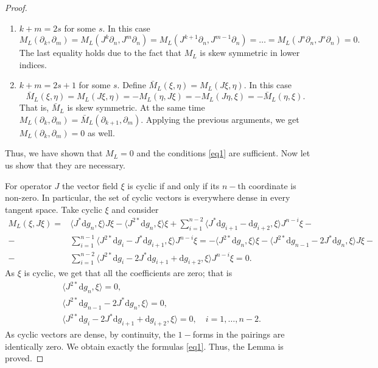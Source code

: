 \documentclass[12pt]{article}
\theoremstyle{remark}
\newcommand{\ddd}{\mathrm{d}}
\begin{document}
\begin{proof}
\begin{enumerate}
    \item $k + m = 2s$ for some $s$. In this case
    $$
    M_L(\partial_k, \partial_m) = M_L(J^k \partial_n, J^m \partial_n) = M_L(J^{k + 1} \partial_n, J^{m - 1} \partial_n) = \dots = M_L(J^s\partial_n, J^s \partial_n) = 0.
    $$
    The last equality holds due to the fact that $M_L$ is skew symmetric in lower indices.
    \item $k + m = 2s + 1$ for some $s$. Define $\bar M_L(\xi, \eta) = M_L(J\xi, \eta)$. In this case
    $$
    \bar M_L(\xi, \eta) = M_L(J\xi, \eta) = - M_L(\eta, J\xi) = - M_L(J\eta, \xi) = - \bar M_L (\eta, \xi).
    $$
    That is, $\bar M_L$ is skew symmetric. At the same time $M_L(\partial_k, \partial_m)= \bar M_L(\partial_{k+1}, \partial_m)$. Applying the previous arguments, we get $M_L(\partial_k, \partial_m) = 0$ as well.
\end{enumerate}
Thus, we have shown that $M_L = 0$ and the conditions \eqref{eq1} are sufficient. Now let us show that they are necessary. 

For operator $J$ the vector field $\xi$ is cyclic if and only if its $n-$th coordinate is non-zero. In particular, the set of cyclic vectors is everywhere dense in every tangent space. Take cyclic $\xi$ and consider
$$
\begin{aligned}
M_L(\xi, J\xi) = & \langle J^* \ddd g_n, \xi \rangle J\xi - \langle J^{2*} \ddd g_n, \xi \rangle \xi + \sum_{i = 1}^{n - 2} \langle J^* \ddd g_{i + 1} - \ddd g_{i + 2}, \xi \rangle J^{n - i} \xi - \\
- & \sum_{i = 1}^{n - 1} \langle J^{2*} \ddd g_i - J^*\ddd g_{i + 1}, \xi \rangle J^{n - i}\xi = - \langle J^{2*} \ddd g_n, \xi \rangle \xi - \langle J^{2*} \ddd g_{n - 1} - 2 J^* \ddd g_n , \xi \rangle J\xi - \\
- & \sum_{i = 1}^{n - 2} \langle J^{2*} \ddd g_i - 2 J^* \ddd g_{i + 1} + \ddd g_{i + 2}, \xi \rangle J^{n - i}\xi = 0.
\end{aligned}
$$
As $\xi$ is cyclic, we get that all the coefficients are zero; that is
$$
\begin{aligned}
& \langle J^{2*} \ddd g_n, \xi \rangle = 0, \\
& \langle J^{2*} \ddd g_{n - 1} - 2 J^* \ddd g_n , \xi \rangle = 0, \\
& \langle J^{2*} \ddd g_i - 2 J^* \ddd g_{i + 1} + \ddd g_{i + 2}, \xi \rangle = 0, \quad i = 1, \dots, n - 2.
\end{aligned}
$$
As cyclic vectors are dense, by continuity, the $1-$forms in the pairings are identically zero. We obtain exactly the formulas \eqref{eq1}. Thus, the Lemma is proved.
\end{proof}
\end{document}
